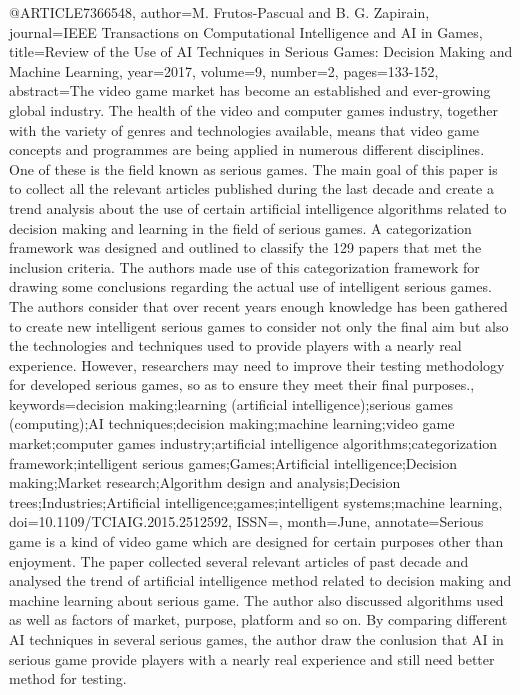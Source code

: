 @ARTICLE{7366548,
  author={M. {Frutos-Pascual} and B. G. {Zapirain}},
  journal={IEEE Transactions on Computational Intelligence and AI in Games},
  title={Review of the Use of AI Techniques in Serious Games: Decision Making and Machine Learning},
  year={2017},
  volume={9},
  number={2},
  pages={133-152},
  abstract={The video game market has become an established and ever-growing global industry. The health of the video and computer games industry, together with the variety of genres and technologies available, means that video game concepts and programmes are being applied in numerous different disciplines. One of these is the field known as serious games. The main goal of this paper is to collect all the relevant articles published during the last decade and create a trend analysis about the use of certain artificial intelligence algorithms related to decision making and learning in the field of serious games. A categorization framework was designed and outlined to classify the 129 papers that met the inclusion criteria. The authors made use of this categorization framework for drawing some conclusions regarding the actual use of intelligent serious games. The authors consider that over recent years enough knowledge has been gathered to create new intelligent serious games to consider not only the final aim but also the technologies and techniques used to provide players with a nearly real experience. However, researchers may need to improve their testing methodology for developed serious games, so as to ensure they meet their final purposes.},
  keywords={decision making;learning (artificial intelligence);serious games (computing);AI techniques;decision making;machine learning;video game market;computer games industry;artificial intelligence algorithms;categorization framework;intelligent serious games;Games;Artificial intelligence;Decision making;Market research;Algorithm design and analysis;Decision trees;Industries;Artificial intelligence;games;intelligent systems;machine learning},
  doi={10.1109/TCIAIG.2015.2512592},
  ISSN={},
  month={June},
  annotate={Serious game is a kind of video game which are designed for certain purposes other than enjoyment. The paper collected several relevant articles of past decade and analysed the trend of artificial intelligence method related to decision making and machine learning about serious game. The author also discussed algorithms used as well as factors of market, purpose, platform and so on. By comparing different AI techniques in several serious games, the author draw the conlusion that AI in serious game provide players with a nearly real experience and still need better method for testing.}
}

